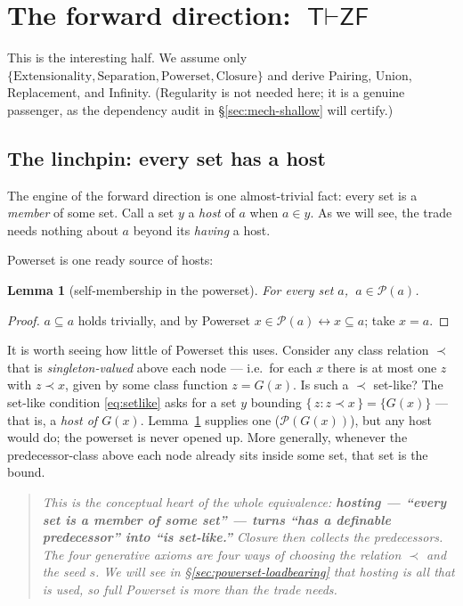 \documentclass[11pt]{article}
\theoremstyle{plain}
\newtheorem{lemma}[theorem]{Lemma}
\theoremstyle{definition}
\newcommand{\Pow}{\mathcal{P}}
\newcommand{\ZF}{\mathsf{ZF}}
\renewcommand{\ZF}{\textsf{ZF}}
\newcommand{\T}{\textsf{T}}
\newcommand{\proves}{\vdash}
\begin{document}
\section{The forward direction: \texorpdfstring{$\T \proves \ZF$}{T proves ZF}}\label{sec:forward}

This is the interesting half. We assume only
$\{\text{Extensionality},\text{Separation},\text{Powerset},\text{Closure}\}$ and
derive Pairing, Union, Replacement, and Infinity. (Regularity is not
needed here; it is a genuine passenger, as the dependency audit in
\S\ref{sec:mech-shallow} will certify.)

\subsection{The linchpin: every set has a host}\label{sec:linchpin}

The engine of the forward direction is one almost-trivial fact: every set is a
\emph{member} of some set. Call a set $y$ a \emph{host} of $a$ when $a \in y$. As we
will see, the trade needs nothing about $a$ beyond its \emph{having} a host.

Powerset is one ready source of hosts:

\begin{lemma}[self-membership in the powerset]\label{lem:self}
For every set $a$, $\ a \in \Pow(a)$.
\end{lemma}
\begin{proof}
$a \subseteq a$ holds trivially, and by Powerset $x \in \Pow(a) \leftrightarrow x \subseteq a$;
take $x = a$.
\end{proof}

It is worth seeing how little of Powerset this uses. Consider any class relation
$\prec$ that is \emph{singleton-valued} above each node --- i.e.\ for each $x$ there
is at most one $z$ with $z \prec x$, given by some class function $z = G(x)$. Is such
a $\prec$ set-like? The set-like condition \eqref{eq:setlike} asks for a set $y$
bounding $\{\,z : z \prec x\,\} = \{G(x)\}$ --- that is, a \emph{host of $G(x)$}.
Lemma~\ref{lem:self} supplies one ($\Pow(G(x))$), but any host would do; the
powerset is never opened up. More generally, whenever the predecessor-class above
each node already sits inside some set, that set is the bound.

\begin{quote}\itshape
This is the conceptual heart of the whole equivalence: \textbf{hosting --- ``every
set is a member of some set'' --- turns ``has a definable predecessor'' into ``is
set-like.''} Closure then collects the predecessors. The four generative axioms are
four ways of choosing the relation $\prec$ and the seed $s$. We will see in
\S\ref{sec:powerset-loadbearing} that hosting is \emph{all} that is used, so full
Powerset is more than the trade needs.
\end{quote}
\end{document}
